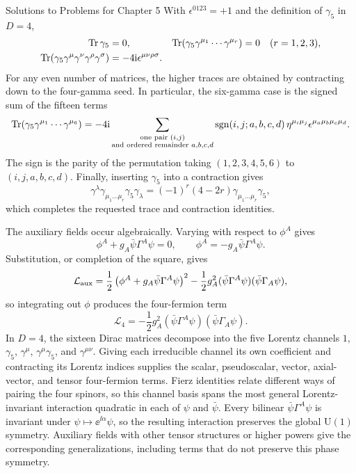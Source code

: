 \begin{bankssolutions}{Solutions to Problems for Chapter 5}
With $\epsilon^{0123}=+1$ and the definition of $\gamma_5$ in $D=4$,
\begin{align*}
 \operatorname{Tr}\gamma_5&=0, & \operatorname{Tr}(\gamma_5\gamma^{\mu_1}\cdots\gamma^{\mu_r})&=0
       &&(r=1,2,3),\\
 \operatorname{Tr}(\gamma_5\gamma^\mu\gamma^\nu\gamma^\rho\gamma^\sigma)
 &=-4\mathrm{i}\epsilon^{\mu\nu\rho\sigma}.
\end{align*}
For any even number of matrices, the higher traces are obtained by contracting
down to the four-gamma seed. In particular, the six-gamma case is the signed sum
of the fifteen terms
\begin{equation*}
 \operatorname{Tr}(\gamma_5\gamma^{\mu_1}\cdots\gamma^{\mu_6})
 =-4\mathrm{i}\sum_{\substack{\text{one pair }(i,j)\\\text{and ordered remainder }a,b,c,d}}
 \operatorname{sgn}(i,j;a,b,c,d)\,
 \eta^{\mu_i\mu_j}\epsilon^{\mu_a\mu_b\mu_c\mu_d}.
\end{equation*}
The sign is the parity of the permutation taking
$(1,2,3,4,5,6)$ to $(i,j,a,b,c,d)$. Finally, inserting $\gamma_5$ into a
contraction gives
\begin{equation*}
 \gamma^\lambda\gamma_{\mu_1\ldots\mu_r}\gamma_5\gamma_\lambda
 =(-1)^r(4-2r)\gamma_{\mu_1\ldots\mu_r}\gamma_5,
\end{equation*}
which completes the requested trace and contraction identities.

The auxiliary fields occur algebraically. Varying with respect to $\phi^A$ gives
\begin{equation*}
 \phi^A+g_A\bar\psi\Gamma^A\psi=0,
 \qquad
 \phi^A=-g_A\bar\psi\Gamma^A\psi.
\end{equation*}
Substitution, or completion of the square, gives
\begin{equation*}
 \mathcal L_{\rm aux}
 =\frac12\left(\phi^A+g_A\bar\psi\Gamma^A\psi\right)^2
 -\frac12g_A^2(\bar\psi\Gamma^A\psi)(\bar\psi\Gamma_A\psi),
\end{equation*}
so integrating out $\phi$ produces the four-fermion term
\begin{equation*}
 \mathcal L_4=-\frac12g_A^2
 (\bar\psi\Gamma^A\psi)(\bar\psi\Gamma_A\psi).
\end{equation*}
In $D=4$, the sixteen Dirac matrices decompose into the five Lorentz channels
$1$, $\gamma_5$, $\gamma^\mu$, $\gamma^\mu\gamma_5$, and
$\gamma^{\mu\nu}$. Giving each irreducible channel its own coefficient and
contracting its Lorentz indices supplies the scalar, pseudoscalar, vector,
axial-vector, and tensor four-fermion terms. Fierz identities relate different
ways of pairing the four spinors, so this channel basis spans the most general
Lorentz-invariant interaction quadratic in each of $\psi$ and $\bar\psi$.
Every bilinear $\bar\psi\Gamma^A\psi$ is invariant under
$\psi\mapsto\ee^{\ii\alpha}\psi$, so the resulting interaction preserves the
global $\mathrm U(1)$ symmetry. Auxiliary fields with other tensor structures or
higher powers give the corresponding generalizations, including terms that do
not preserve this phase symmetry.


\end{bankssolutions}
